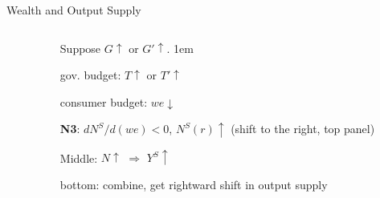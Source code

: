 \documentclass[11pt,aspectratio=43,usenames,dvipsnames]{beamer}
\let\olditemize=\itemize
\let\endolditemize=\enditemize
\renewenvironment{itemize}{\olditemize \itemsep1em}{\endolditemize}
\theoremstyle{definition}
\begin{document}
\begin{frame}{Wealth and Output Supply}
\begin{columns}
\begin{column}{0.5\textwidth}
        \end{column}
        \begin{column}{0.5\textwidth}
            Suppose $ G \uparrow  $ or $ G' \uparrow  $.
            \begin{itemize}
                \item gov. budget: $ T \uparrow  $ or $ T' \uparrow  $
                \item consumer budget: $ we \downarrow  $
                \item \textbf{N3}: $ \displaystyle d N^{S} / d ( we ) < 0 $, $ N^{S}( r ) \uparrow  $ (shift to the right, top panel)
                \item Middle: $ N\uparrow  $ $ \Rightarrow  $ $ Y^{S} \uparrow  $
                \item bottom: combine, get rightward shift in output supply
            \end{itemize}
        \end{column}
    \end{columns}
\end{frame}
\end{document}
